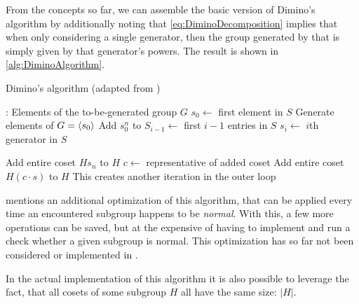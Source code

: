 \documentclass[parskip=half]{scrartcl}
\begin{document}
	From the concepts so far, we can assemble the basic version of Dimino's algorithm by additionally noting that \cref{eq:DiminoDecomposition}
	implies that when only considering a single generator, then the group generated by that is simply given by that generator's
	powers.\supercite{Butler1991a} The result is shown in \cref{alg:DiminoAlgorithm}.

	\begin{algorithm}[!htb]
		\caption{Dimino's algorithm (adapted from \textcite{Butler1991a})}
		\label{alg:DiminoAlgorithm}

		\begin{algorithmic}[1]
				\State {}: Elements of the to-be-generated group $G$
				\State $s_0 \gets $ first element in $S$
				\Comment Generate elements of $G = \braket{s_0}$
					\State Add $s_0^n$ to 
				\EndFor
				\For{$i \in [1, $ size of $S) \wedge i \in \mathbb{N}$}
					\State $S_{i-1} \gets$ first $i - 1$ entries in $S$
					\State $s_i \gets$ $i$th generator in $S$
					\State {}
				\EndFor
			\EndFunction

					\State \Return
				\EndIf
				\State Add entire coset $H s_n$ to $H$
					\State $c \gets $ representative of added coset
							\State Add entire coset $H (c \cdot s)$ to $H$
							\Comment This creates another iteration in the outer loop
						\EndIf
					\EndFor
				\EndFor
			\EndFunction
		\end{algorithmic}
	\end{algorithm}

	\textcite{Butler1991a} mentions an additional optimization of this algorithm, that can be applied every time an encountered subgroup happens to be
	\emph{normal}. With this, a few more operations can be saved, but at the expensive of having to implement and run a check whether a given subgroup
	is normal. This optimization has so far not been considered or implemented in .

	In the actual implementation of this algorithm it is also possible to leverage the fact, that all cosets of some subgroup $H$ all have the same
	size: $|H|$.
\end{document}
